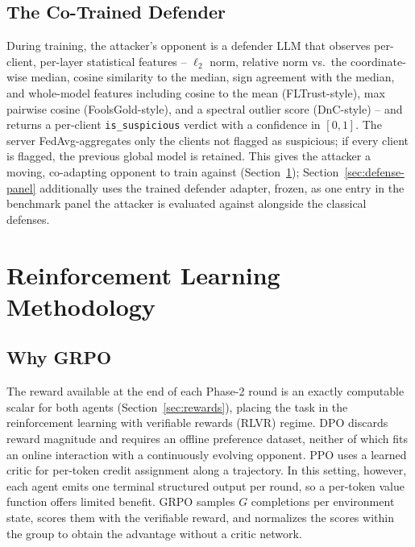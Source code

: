 \documentclass[conference]{IEEEtran}
\begin{document}
\subsection{The Co-Trained Defender}
\label{sec:defender-contract}
During training, the attacker's opponent is a defender LLM that observes per-client, per-layer statistical features -- $\ell_2$ norm, relative norm vs.\ the coordinate-wise median, cosine similarity to the median, sign agreement with the median, and whole-model features including cosine to the mean (FLTrust-style), max pairwise cosine (FoolsGold-style), and a spectral outlier score (DnC-style) -- and returns a per-client \texttt{is\_suspicious} verdict with a confidence in $[0,1]$. The server FedAvg-aggregates only the clients not flagged as suspicious; if every client is flagged, the previous global model is retained. This gives the attacker a moving, co-adapting opponent to train against (Section~\ref{sec:rl}); Section~\ref{sec:defense-panel} additionally uses the trained defender adapter, frozen, as one entry in the benchmark panel the attacker is evaluated against alongside the classical defenses.

\section{Reinforcement Learning Methodology}
\label{sec:rl}

\subsection{Why GRPO}
The reward available at the end of each Phase-2 round is an exactly computable scalar for both agents (Section~\ref{sec:rewards}), placing the task in the reinforcement learning with verifiable rewards (RLVR) regime. DPO discards reward magnitude and requires an offline preference dataset, neither of which fits an online interaction with a continuously evolving opponent. PPO uses a learned critic for per-token credit assignment along a trajectory. In this setting, however, each agent emits one terminal structured output per round, so a per-token value function offers limited benefit. GRPO samples $G$ completions per environment state, scores them with the verifiable reward, and normalizes the scores within the group to obtain the advantage without a critic network.
\end{document}

